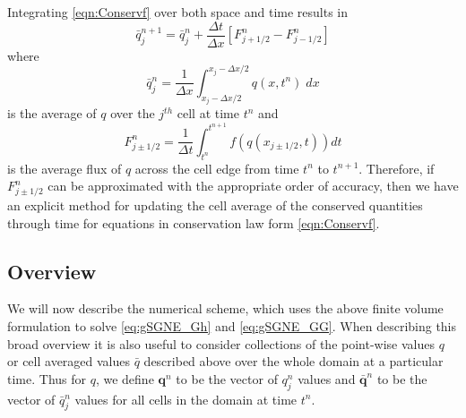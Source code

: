 \documentclass[10pt]{elsarticle}
\newcommand{\vecn}[1]{\boldsymbol{#1}}
\begin{document}
Integrating \eqref{eqn:Conservf} over both space and time results in
\begin{equation}
\bar{q}^{n+1}_j = \bar{q}^{n}_j  +  \dfrac{\Delta t}{\Delta x}\left[F^n_{j+1/2} - F^n_{j-1/2}\right]
\label{eqn:ConsFVM}
\end{equation}
where 
\begin{equation*}
\bar{q}^n_j = \frac{1}{\Delta x} \int_{x_j - \Delta x / 2}^{x_j - \Delta x / 2} q(x,t^n) \; dx
\end{equation*}
is the average of $q$ over the $j^{th}$ cell at time $t^n$ and   
\begin{equation*}
F^n_{j\pm 1/2} =\frac{1}{\Delta t} \int_{t^n}^{t^{n+1}} f(q(x_{j\pm 1/2},t)) dt
\end{equation*}
is the average flux of $q$ across the cell edge from time $t^n$ to $t^{n+1}$. Therefore, if $F^n_{j\pm 1/2}$ can be approximated with the appropriate order of accuracy, then we have an explicit method for updating the cell average of the conserved quantities through time for equations in conservation law form \eqref{eqn:Conservf}. 


\subsection{Overview}
\label{subsec:Overview}
We will now describe the numerical scheme, which uses the above finite volume formulation to solve \eqref{eq:gSGNE_Gh} and \eqref{eq:gSGNE_GG}. When describing this broad overview it is also useful to consider collections of the point-wise values $q$ or cell averaged values $\bar{q}$ described above over the whole domain at a particular time. Thus for $q$, we define $\vecn{q}^n$ to be the vector of $q^n_j$ values and $\bar{\vecn{q}}^n$ to be the vector of $\bar{q}^n_j$ values for all cells in the domain at time $t^n$. 
\end{document}

